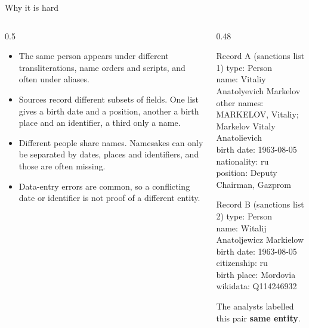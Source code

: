 \documentclass[aspectratio=169,10pt]{beamer}
\newcommand{\hi}[1]{\textcolor{accent2}{\textbf{#1}}}
\begin{document}
\begin{frame}{Why it is hard}
\begin{columns}[T]
\begin{column}{0.5\textwidth}
\begin{itemize}
\item The same person appears under different transliterations, name orders and scripts, and often under aliases.
\item Sources record different subsets of fields. One list gives a birth date and a position, another a birth place and an identifier, a third only a name.
\item Different people share names. Namesakes can only be separated by dates, places and identifiers, and those are often missing.
\item Data-entry errors are common, so a conflicting date or identifier is not proof of a different entity.
\end{itemize}
\end{column}
\begin{column}{0.48\textwidth}
\begin{block}{Record A (sanctions list 1)}
\scriptsize\ttfamily
type: Person\\
name: Vitaliy Anatolyevich Markelov\\
other names: MARKELOV, Vitaliy; Markelov Vitaly Anatolievich\\
birth date: 1963-08-05 \quad nationality: ru\\
position: Deputy Chairman, Gazprom
\end{block}
\begin{block}{Record B (sanctions list 2)}
\scriptsize\ttfamily
type: Person\\
name: Witalij Anatoljewicz Markielow\\
birth date: 1963-08-05 \quad citizenship: ru\\
birth place: Mordovia \quad wikidata: Q114246932
\end{block}
\small The analysts labelled this pair \hi{same entity}.
\end{column}
\end{columns}
\end{frame}
\end{document}

